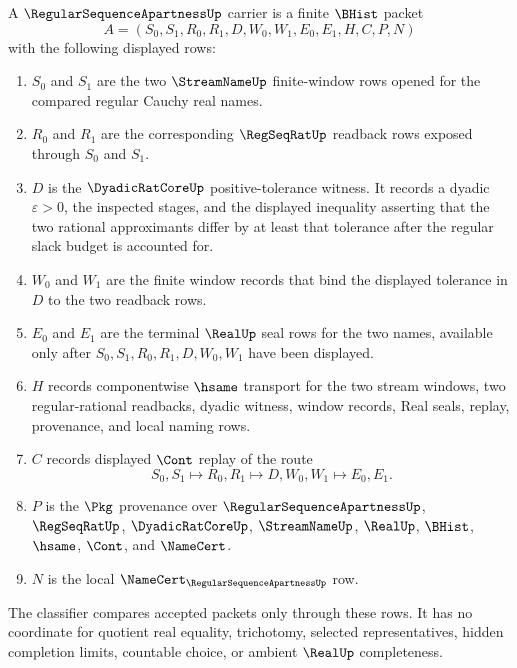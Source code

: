 \begin{definition}
\label{def:regular-sequence-apartness-carrier}
A $\RegularSequenceApartnessUp$ carrier is a finite $\BHist$ packet
$$
A=(S_0,S_1,R_0,R_1,D,W_0,W_1,E_0,E_1,H,C,P,N)
$$
with the following displayed rows:
\begin{enumerate}
\item $S_0$ and $S_1$ are the two $\StreamNameUp$ finite-window rows opened for the compared regular Cauchy real names.
\item $R_0$ and $R_1$ are the corresponding $\RegSeqRatUp$ readback rows exposed through $S_0$ and $S_1$.
\item $D$ is the $\DyadicRatCoreUp$ positive-tolerance witness. It records a dyadic $\varepsilon>0$, the inspected stages, and the displayed inequality asserting that the two rational approximants differ by at least that tolerance after the regular slack budget is accounted for.
\item $W_0$ and $W_1$ are the finite window records that bind the displayed tolerance in $D$ to the two readback rows.
\item $E_0$ and $E_1$ are the terminal $\RealUp$ seal rows for the two names, available only after $S_0,S_1,R_0,R_1,D,W_0,W_1$ have been displayed.
\item $H$ records componentwise $\hsame$ transport for the two stream windows, two regular-rational readbacks, dyadic witness, window records, Real seals, replay, provenance, and local naming rows.
\item $C$ records displayed $\Cont$ replay of the route
$$
S_0,S_1 \longmapsto R_0,R_1 \longmapsto D,W_0,W_1 \longmapsto E_0,E_1 .
$$
\item $P$ is the $\Pkg$ provenance over $\RegularSequenceApartnessUp$, $\RegSeqRatUp$, $\DyadicRatCoreUp$, $\StreamNameUp$, $\RealUp$, $\BHist$, $\hsame$, $\Cont$, and $\NameCert$.
\item $N$ is the local $\NameCert_{\RegularSequenceApartnessUp}$ row.
\end{enumerate}
The classifier compares accepted packets only through these rows. It has no coordinate for quotient real equality, trichotomy, selected representatives, hidden completion limits, countable choice, or ambient $\RealUp$ completeness.
\end{definition}

